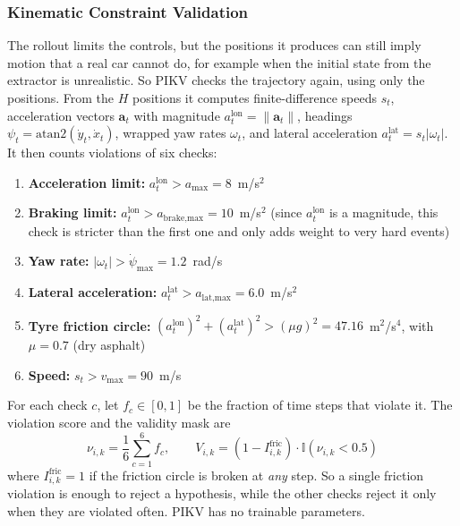 \documentclass[preprint,12pt]{elsarticle}
\begin{document}
\subsubsection{Kinematic Constraint Validation}
The rollout limits the controls, but the positions it produces can still imply motion that a real car cannot do, for example when the initial state from the extractor is unrealistic. So PIKV checks the trajectory again, using only the positions. From the $H$ positions it computes finite-difference speeds $s_t$, acceleration vectors $\mathbf{a}_t$ with magnitude $a^{\text{lon}}_t = \|\mathbf{a}_t\|$, headings $\psi_t = \text{atan2}(\dot{y}_t, \dot{x}_t)$, wrapped yaw rates $\omega_t$, and lateral acceleration $a^{\text{lat}}_t = s_t |\omega_t|$. It then counts violations of six checks:
\begin{enumerate}
    \item \textbf{Acceleration limit:} $a^{\text{lon}}_t > a_{\max} = 8$~m/s$^2$
    \item \textbf{Braking limit:} $a^{\text{lon}}_t > a_{\text{brake,max}} = 10$~m/s$^2$ (since $a^{\text{lon}}_t$ is a magnitude, this check is stricter than the first one and only adds weight to very hard events)
    \item \textbf{Yaw rate:} $|\omega_t| > \dot{\psi}_{\max} = 1.2$~rad/s
    \item \textbf{Lateral acceleration:} $a^{\text{lat}}_t > a_{\text{lat,max}} = 6.0$~m/s$^2$
    \item \textbf{Tyre friction circle:} $(a^{\text{lon}}_t)^2 + (a^{\text{lat}}_t)^2 > (\mu g)^2 = 47.16$~m$^2$/s$^4$, with $\mu = 0.7$ (dry asphalt)
    \item \textbf{Speed:} $s_t > v_{\max} = 90$~m/s
\end{enumerate}
For each check $c$, let $f_c \in [0,1]$ be the fraction of time steps that violate it. The violation score and the validity mask are
\begin{equation}
    \nu_{i,k} = \frac{1}{6} \sum_{c=1}^{6} f_c, \qquad
    V_{i,k} = \left(1 - I^{\text{fric}}_{i,k}\right) \cdot \mathbb{I}\left(\nu_{i,k} < 0.5\right)
    \label{eq_validity}
\end{equation}
where $I^{\text{fric}}_{i,k} = 1$ if the friction circle is broken at \emph{any} step. So a single friction violation is enough to reject a hypothesis, while the other checks reject it only when they are violated often. PIKV has no trainable parameters.
\end{document}
